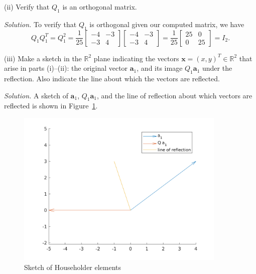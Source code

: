 \documentclass{article}
\def\*#1{\mathbf{#1}}
\newcommand{\R}{\mathbb{R}}
\begin{document}
\vspace{5mm}

(ii) Verify that $Q_1$ is an orthogonal matrix.

\textit{Solution.}
To verify that $Q_1$ is orthogonal given our computed matrix, we have
%
\begin{equation*}
    Q_1 Q_1^T = Q_1^2 = \frac{1}{25}
        \begin{bmatrix}
            -4 & -3 \\
            -3 & 4
        \end{bmatrix}
        \begin{bmatrix}
            -4 & -3 \\
            -3 & 4
        \end{bmatrix}
        = \frac{1}{25}
        \begin{bmatrix}
            25 & 0 \\
            0 & 25
        \end{bmatrix}
        = I_2
        .
\end{equation*}

\vspace{5mm}

(iii) Make a sketch in the $\R^2$ plane indicating the vectors
$\*x = (x, y)^T \in \R^2$ that arise in parts (i)--(ii):
the original vector $\*a_1$, and its image $Q_1 \*a_1$ under the reflection.
Also indicate the line about which the vectors are reflected.

\textit{Solution.}
A sketch of $\*a_1$, $Q_1 \*a_1$, and the line of reflection about which
vectors are reflected is shown in Figure~\ref{fig:q5plot}.
%
\begin{figure}
    \includegraphics[width=10cm]{q5plot}
    \centering
    \caption{Sketch of Householder elements}
    \label{fig:q5plot}
\end{figure}
\end{document}
